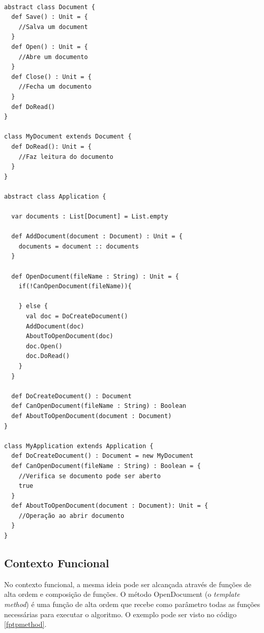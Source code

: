 \begin{lstlisting}[caption={Template Method Orientação a Objetos},label=ootpmethod]

abstract class Document {
  def Save() : Unit = {
    //Salva um document
  }
  def Open() : Unit = {
    //Abre um documento
  }
  def Close() : Unit = {
    //Fecha um documento
  }
  def DoRead()
}

class MyDocument extends Document {
  def DoRead(): Unit = {
    //Faz leitura do documento
  }
}

abstract class Application {

  var documents : List[Document] = List.empty

  def AddDocument(document : Document) : Unit = {
    documents = document :: documents
  }

  def OpenDocument(fileName : String) : Unit = {
    if(!CanOpenDocument(fileName)){

    } else {
      val doc = DoCreateDocument()
      AddDocument(doc)
      AboutToOpenDocument(doc)
      doc.Open()
      doc.DoRead()
    }
  }

  def DoCreateDocument() : Document
  def CanOpenDocument(fileName : String) : Boolean
  def AboutToOpenDocument(document : Document)
}

class MyApplication extends Application {
  def DoCreateDocument() : Document = new MyDocument
  def CanOpenDocument(fileName : String) : Boolean = {
    //Verifica se documento pode ser aberto
    true
  }
  def AboutToOpenDocument(document : Document): Unit = {
    //Operação ao abrir documento
  }
}

\end{lstlisting}

\subsection*{Contexto Funcional}

No contexto funcional, a mesma ideia pode ser alcançada 
através de funções de alta ordem e composição de funções. 
O método OpenDocument (o \textit{template method}) é 
uma função de alta ordem que recebe como parâmetro todas 
as funções necessárias para executar o algoritmo. 
O exemplo pode ser visto no código \ref{fptpmethod}.

